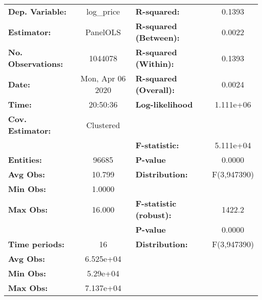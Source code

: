\documentclass{report}
\begin{document}
\begin{center}
\begin{tabular}{lclc}
\toprule
\textbf{Dep. Variable:}        &     log\_price     & \textbf{  R-squared:         }   &      0.1393      \\
\textbf{Estimator:}            &      PanelOLS      & \textbf{  R-squared (Between):}  &      0.0022      \\
\textbf{No. Observations:}     &      1044078       & \textbf{  R-squared (Within):}   &      0.1393      \\
\textbf{Date:}                 &  Mon, Apr 06 2020  & \textbf{  R-squared (Overall):}  &      0.0024      \\
\textbf{Time:}                 &      20:50:36      & \textbf{  Log-likelihood     }   &    1.111e+06     \\
\textbf{Cov. Estimator:}       &     Clustered      & \textbf{                     }   &                  \\
\textbf{}                      &                    & \textbf{  F-statistic:       }   &    5.111e+04     \\
\textbf{Entities:}             &       96685        & \textbf{  P-value            }   &      0.0000      \\
\textbf{Avg Obs:}              &       10.799       & \textbf{  Distribution:      }   &   F(3,947390)    \\
\textbf{Min Obs:}              &       1.0000       & \textbf{                     }   &                  \\
\textbf{Max Obs:}              &       16.000       & \textbf{  F-statistic (robust):} &      1422.2      \\
\textbf{}                      &                    & \textbf{  P-value            }   &      0.0000      \\
\textbf{Time periods:}         &         16         & \textbf{  Distribution:      }   &   F(3,947390)    \\
\textbf{Avg Obs:}              &     6.525e+04      & \textbf{                     }   &                  \\
\textbf{Min Obs:}              &      5.29e+04      & \textbf{                     }   &                  \\
\textbf{Max Obs:}              &     7.137e+04      & \textbf{                     }   &                  \\
\bottomrule
\end{tabular}
\begin{tabular}{lcccccc}

\end{tabular}
\end{center}
\end{document}
